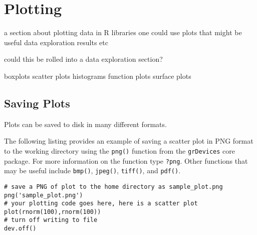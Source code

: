 
\section{Plotting} 
\label{advanced:plotting}

a section about plotting data in R
libraries one could use
plots that might be useful
data exploration
results 
etc

could this be rolled into a data exploration section?


boxplots
scatter plots
histograms
function plots
surface plots

% 
% 
\subsection{Saving Plots}
Plots can be saved to disk in many different formats.

The following listing provides an example of saving a scatter plot in PNG format to the working directory using the \texttt{png()} function from the \texttt{grDevices} core package. For more information on the function type \texttt{?png}. Other functions that may be useful include \texttt{bmp()}, \texttt{jpeg()}, \texttt{tiff()}, and \texttt{pdf()}.

\begin{lstlisting}
# save a PNG of plot to the home directory as sample_plot.png
png('sample_plot.png')
# your plotting code goes here, here is a scatter plot
plot(rnorm(100),rnorm(100))
# turn off writing to file
dev.off()
\end{lstlisting}



